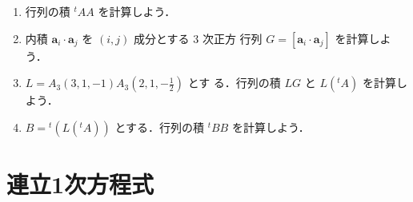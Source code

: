 \documentclass[11pt, uplatex, dvipdfmx]{jsarticle}
\begin{document}
\begin{enumerate}[label=\ref{sec:transform}.\arabic*]
  \vspace{1zh}

  \begin{enumerate}[label=(\arabic*)]
    \setlength{\itemsep}{1ex}

  \item 行列の積 ${}^{t}A A$ を計算しよう．
    
  \item 内積 $\bm{a}_i \cdot \bm{a}_j$ を $(i,j)$ 成分とする $3$ 次正方
    行列 $G=\left[ \bm{a}_i \cdot \bm{a}_j\right]$ を計算しよう．

  \item $L=A_3(3,1,-1) A_3\left(2,1,-\frac{1}{2}\right)$ とす
    る．行列の積 $LG$ と $L ({}^{t}A)$ を計算しよう．

  \item $B={}^{t}\left( L ({}^{t}A)\right)$ とする．行列の積 ${}^{t} B  B$ を計算しよう．
    
    
  \end{enumerate}
\end{enumerate}

\newpage

\section{連立1次方程式}\label{sec:system}
\end{document}
